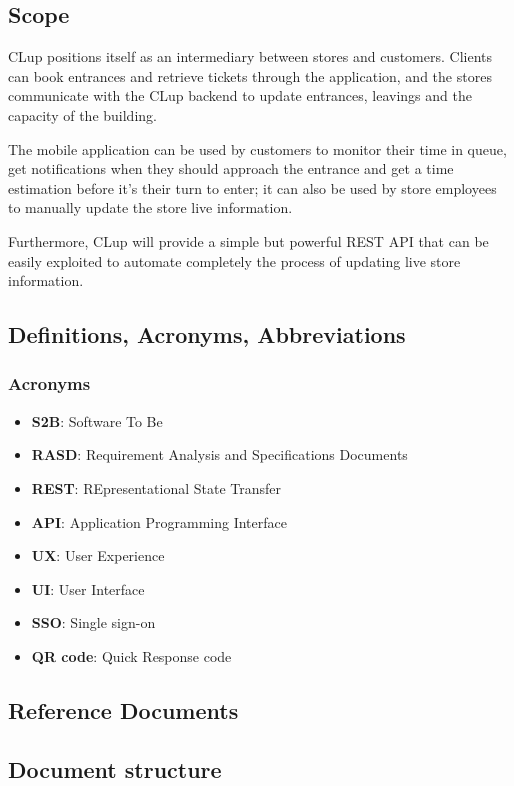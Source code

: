 \subsection{Scope}
CLup positions itself as an intermediary between stores and customers. Clients can book entrances and retrieve tickets through the application, and the stores communicate with the CLup backend to update entrances, leavings and the capacity of the building.

\medskip

The mobile application can be used by customers to monitor their time in queue, get notifications when they should approach the entrance and get a time estimation before it's their turn to enter; it can also be used by store employees to manually update the store live information.

\medskip

Furthermore, CLup will provide a simple but powerful REST API that can be easily exploited to automate completely the process of updating live store information.

\vfill

\pagebreak

\subsection{Definitions, Acronyms, Abbreviations}

\subsubsection{Acronyms}

\begin{itemize}
      \item \textbf{S2B}: Software To Be
      \item \textbf{RASD}: Requirement Analysis and Specifications Documents
      \item \textbf{REST}: REpresentational State Transfer
      \item \textbf{API}: Application Programming Interface
      \item \textbf{UX}: User Experience
      \item \textbf{UI}: User Interface
      \item \textbf{SSO}: Single sign-on
      \item \textbf{QR code}: Quick Response code
\end{itemize}

\subsection{Reference Documents}
\subsection{Document structure}
